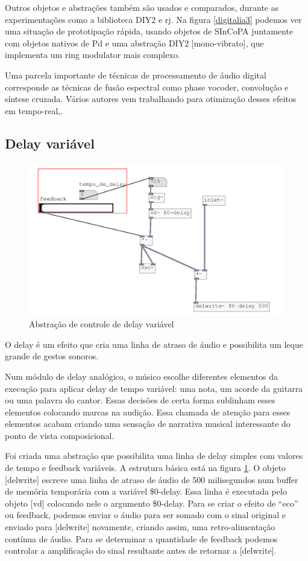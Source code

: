 \documentclass{ppgmus}
\begin{document}
Outros objetos e abstrações também são usados e comparados, durante as experimentações
como a biblioteca DIY2 e rj. Na figura \ref{digitalia3} podemos ver uma situação de prototipação
rápida, usando objetos de SInCoPA juntamente com objetos nativos de Pd e uma abstração DIY2 [mono-vibrato],
que implementa um ring modulator mais complexo. 

Uma parcela importante de técnicas de processamento de áudio digital corresponde as técnicas
de fusão espectral como phase vocoder, convolução e síntese cruzada. Vários autores vem trabalhando
para otimização desses efeitos em tempo-real\cite{porres},\cite{pd-tutorial}. 


\subsection{Delay variável}


\begin{figure}
\includegraphics[scale=.5]{sinc-delay}
\caption{Abstração de controle de delay variável}
\label{sinc-delay}
\end{figure}


O delay é um efeito que cria uma linha de atraso de áudio e possibilita
um leque grande de gestos sonoros.

Num módulo  de delay analógico, o músico escolhe diferentes elementos
da execução para aplicar delay de tempo variável: uma nota, um acorde 
da guitarra ou uma palavra do cantor. Essas decisões de certa forma 
sublinham esses elementos colocando marcas na audição. Essa chamada de
atenção para esses elementos acabam criando uma sensação de narrativa musical
interessante do ponto de vista composicional.

Foi criada uma abstração que possibilita uma linha de delay simples com valores
de tempo e feedback variáveis. A estrutura básica está na figura \ref{sinc-delay}. O objeto 
[delwrite\texttildelow] escreve uma linha de atraso de áudio de 500 milisegundos
num buffer de memória temporária com a variável \$0-delay. Essa linha é executada
pelo objeto [vd\texttildelow] colocando nele o argumento \$0-delay. Para se criar
o efeito de ``eco'' ou feedback, podemos enviar o áudio para ser somado com o sinal
original e enviado para [delwrite\texttildelow] novamente, criando assim, uma retro-alimentação
contínua de áudio. Para se determinar a quantidade de feedback podemos controlar a 
amplificação do sinal resultante antes de retornar a [delwrite\texttildelow].
\end{document}
